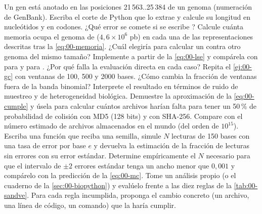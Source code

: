 \begin{ejercicios}
 Un gen está anotado en las posiciones 21\,563..25\,384 de un genoma (numeración de GenBank). Escriba el corte de Python que lo extrae y calcule su longitud en nucleótidos y en codones. ¿Qué error se comete si se escribe ?
 Calcule cuánta memoria ocupa el genoma de  ($4{,}6\times10^6$ pb) en cada una de las representaciones descritas tras la \cref{eq:00-memoria}. ¿Cuál elegiría para calcular un  contra otro genoma del mismo tamaño?
 Implemente  a partir de la \cref{eq:00-lse} y compárela con  para  y para . ¿Por qué falla la evaluación directa en cada caso?
 Repita el \cref{ej:00-gc} con ventanas de 100, 500 y 2000 bases. ¿Cómo cambia la fracción de ventanas fuera de la banda binomial? Interprete el resultado en términos de ruido de muestreo y de heterogeneidad biológica.
 Demuestre la aproximación de la \cref{eq:00-cumple} y úsela para calcular cuántos archivos harían falta para tener un 50\,\% de probabilidad de colisión con MD5 (128 bits) y con SHA-256. Compare con el número estimado de archivos almacenados en el mundo (del orden de $10^{15}$).
 Escriba una función que reciba una semilla, simule $N$ lecturas de 150 bases con una tasa de error por base $e$ y devuelva la estimación de la fracción de lecturas sin errores con su error estándar. Determine empíricamente el $N$ necesario para que el intervalo de $\pm2$ errores estándar tenga un ancho menor que $0{,}001$ y compárelo con la predicción de la \cref{eq:00-mc}.
 Tome un análisis propio (o el cuaderno de la \cref{sec:00-biopython}) y evalúelo frente a las diez reglas de la \cref{tab:00-sandve}. Para cada regla incumplida, proponga el cambio concreto (un archivo, una línea de código, un comando) que la haría cumplir.
\end{ejercicios}

